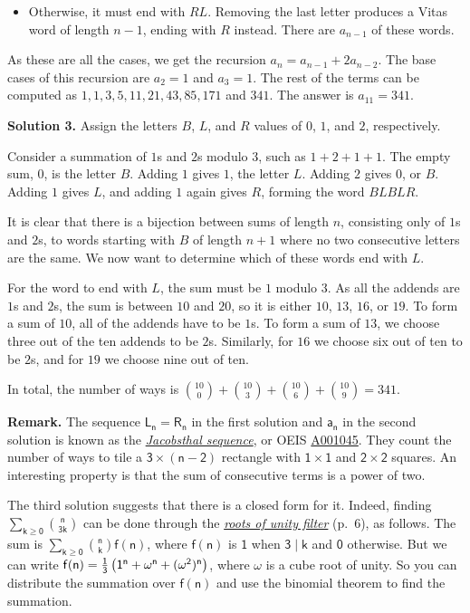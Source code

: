 \documentclass[11pt,paper=letter]{scrartcl}
\begin{document}
\begin{enumerate}[left=0pt]
\begin{itemize}
  \item Otherwise, it must end with $RL$. Removing the last letter produces a Vitas word of length $n-1$, ending with $R$ instead. There are $a_{n-1}$ of these words.
\end{itemize}

As these are all the cases, we get the recursion $a_n = a_{n-1} + 2a_{n-2}$. The base cases of this recursion are $a_2 = 1$ and $a_3 = 1$. The rest of the terms can be computed as $1, 1, 3, 5, 11, 21, 43, 85, 171$ and $341$. The answer is $a_{11} = 341$.

{\sffamily \bfseries Solution 3.} Assign the letters $B$, $L$, and $R$ values of $0$, $1$, and $2$, respectively.

Consider a summation of $1$s and $2$s modulo 3, such as $1 + 2 + 1 + 1$. The empty sum, $0$, is the letter $B$. Adding $1$ gives $1$, the letter $L$. Adding $2$ gives $0$, or $B$. Adding $1$ gives $L$, and adding $1$ again gives $R$, forming the word $BLBLR$.

It is clear that there is a bijection between sums of length $n$, consisting only of $1$s and $2$s, to words starting with $B$ of length $n+1$ where no two consecutive letters are the same. We now want to determine which of these words end with $L$.

For the word to end with $L$, the sum must be $1$ modulo $3$. As all the addends are $1$s and $2$s, the sum is between $10$ and $20$, so it is either $10$, $13$, $16$, or $19$. To form a sum of $10$, all of the addends have to be $1$s. To form a sum of $13$, we choose three out of the ten addends to be $2$s. Similarly, for $16$ we choose six out of ten to be $2$s, and for $19$ we choose nine out of ten.

In total, the number of ways is $\displaystyle \binom{10}0 + \binom{10}3 + \binom{10}6 + \binom{10}9 = 341$.

{\small \sffamily \textbf{Remark.} The sequence $\mathsf{L_n = R_n}$ in the first solution and $\mathsf{a_n}$ in the second solution is known as the \href{https://en.wikipedia.org/wiki/Jacobsthal_number}{\emph{Jacobsthal sequence}}, or OEIS \href{https://oeis.org/A001045}{A001045}. They count the number of ways to tile a $\mathsf{3 \times (n - 2)}$ rectangle with $\mathsf{1 \times 1}$ and $\mathsf{2 \times 2}$ squares. An interesting property is that the sum of consecutive terms is a power of two.

The third solution suggests that there is a closed form for it. Indeed, finding $\mathsf{\sum_{k \geq 0} \binom{n}{3k}}$ can be done through the \href{http://web.evanchen.cc/handouts/Summation/Summation.pdf}{\emph{roots of unity filter}} (p.~6), as follows. The sum is $\mathsf{\sum_{k \geq 0} \binom{n}{k}f(n)}$, where $\mathsf{f(n)}$ is $\mathsf{1}$ when $\mathsf{3\mid k}$ and $\mathsf{0}$ otherwise. But we can write $\mathsf{f(n) = \frac13\left( 1^n + \omega^n + (\omega^2)^n \right)}$, where $\mathsf{\omega}$ is a cube root of unity. So you can distribute the summation over $\mathsf{f(n)}$ and use the binomial theorem to find the summation.}


\end{enumerate}
\end{document}
